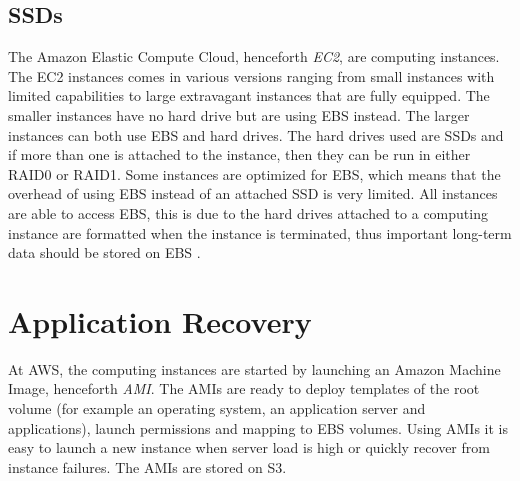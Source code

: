 \documentclass[11pt]{report}
\begin{document}
\subsection{SSDs}
The Amazon Elastic Compute Cloud, henceforth \emph{EC2}, are computing instances. The EC2 instances comes in various versions ranging from small instances with limited capabilities to large extravagant instances that are fully equipped. The smaller instances have no hard drive but are using EBS instead. The larger instances can both use EBS and hard drives. The hard drives used are SSDs and if more than one is attached to the instance, then they can be run in either RAID0 or RAID1. Some instances are optimized for EBS, which means that the overhead of using EBS instead of an attached SSD is very limited. All instances are able to access EBS, this is due to the hard drives attached to a computing instance are formatted when the instance is terminated, thus important long-term data should be stored on EBS \cite{AWS_instance_storage}. 

\section{Application Recovery}
At AWS, the computing instances are started by launching an Amazon Machine Image, henceforth \emph{AMI}. The AMIs are ready to deploy templates of the root volume (for example an operating system, an application server and applications), launch permissions and mapping to EBS volumes. Using AMIs it is easy to launch a new instance when server load is high or quickly recover from instance failures. The AMIs are stored on S3.
\end{document}
